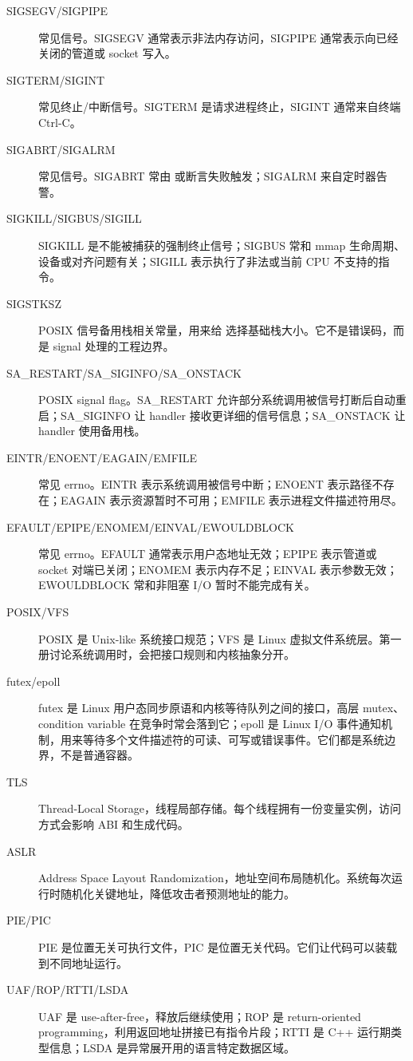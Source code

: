 \begin{description}
  \item[SIGSEGV/SIGPIPE] 常见信号。SIGSEGV 通常表示非法内存访问，SIGPIPE 通常表示向已经关闭的管道或 socket 写入。
  \item[SIGTERM/SIGINT] 常见终止/中断信号。SIGTERM 是请求进程终止，SIGINT 通常来自终端 Ctrl-C。
  \item[SIGABRT/SIGALRM] 常见信号。SIGABRT 常由  或断言失败触发；SIGALRM 来自定时器告警。
  \item[SIGKILL/SIGBUS/SIGILL] SIGKILL 是不能被捕获的强制终止信号；SIGBUS 常和 mmap 生命周期、设备或对齐问题有关；SIGILL 表示执行了非法或当前 CPU 不支持的指令。
  \item[SIGSTKSZ] POSIX 信号备用栈相关常量，用来给  选择基础栈大小。它不是错误码，而是 signal 处理的工程边界。
  \item[SA\_RESTART/SA\_SIGINFO/SA\_ONSTACK] POSIX signal flag。SA\_RESTART 允许部分系统调用被信号打断后自动重启；SA\_SIGINFO 让 handler 接收更详细的信号信息；SA\_ONSTACK 让 handler 使用备用栈。
  \item[EINTR/ENOENT/EAGAIN/EMFILE] 常见 errno。EINTR 表示系统调用被信号中断；ENOENT 表示路径不存在；EAGAIN 表示资源暂时不可用；EMFILE 表示进程文件描述符用尽。
  \item[EFAULT/EPIPE/ENOMEM/EINVAL/EWOULDBLOCK] 常见 errno。EFAULT 通常表示用户态地址无效；EPIPE 表示管道或 socket 对端已关闭；ENOMEM 表示内存不足；EINVAL 表示参数无效；EWOULDBLOCK 常和非阻塞 I/O 暂时不能完成有关。
  \item[POSIX/VFS] POSIX 是 Unix-like 系统接口规范；VFS 是 Linux 虚拟文件系统层。第一册讨论系统调用时，会把接口规则和内核抽象分开。
  \item[futex/epoll] futex 是 Linux 用户态同步原语和内核等待队列之间的接口，高层 mutex、condition variable 在竞争时常会落到它；epoll 是 Linux I/O 事件通知机制，用来等待多个文件描述符的可读、可写或错误事件。它们都是系统边界，不是普通容器。
  \item[TLS] Thread-Local Storage，线程局部存储。每个线程拥有一份变量实例，访问方式会影响 ABI 和生成代码。
  \item[ASLR] Address Space Layout Randomization，地址空间布局随机化。系统每次运行时随机化关键地址，降低攻击者预测地址的能力。
  \item[PIE/PIC] PIE 是位置无关可执行文件，PIC 是位置无关代码。它们让代码可以装载到不同地址运行。
  \item[UAF/ROP/RTTI/LSDA] UAF 是 use-after-free，释放后继续使用；ROP 是 return-oriented programming，利用返回地址拼接已有指令片段；RTTI 是 C++ 运行期类型信息；LSDA 是异常展开用的语言特定数据区域。

\end{description}

